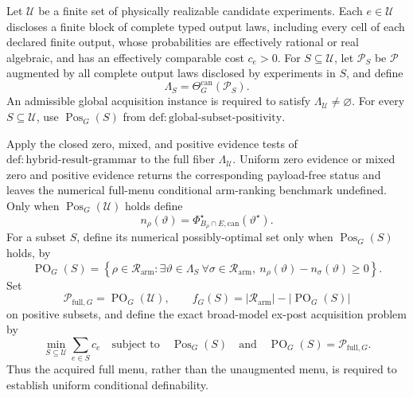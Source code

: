 Let \(\mathcal U\) be a finite set of physically realizable candidate experiments.  Each \(e\in\mathcal U\) discloses a finite block of complete typed output laws, including every cell of each declared finite output, whose probabilities are effectively rational or real algebraic, and has an effectively comparable cost \(c_e>0\).  For \(S\subseteq\mathcal U\), let \(\mathcal P_S\) be \(\mathcal P\) augmented by all complete output laws disclosed by experiments in \(S\), and define
\[
\Lambda_S=\Theta_G^{\mathrm{can}}(\mathcal P_S).
\]
An admissible global acquisition instance is required to satisfy \(\Lambda_{\mathcal U}\ne\varnothing\).  For every \(S\subseteq\mathcal U\), use \(\operatorname{Pos}_G(S)\) from \(\mathrm{def:global\text{-}subset\text{-}positivity}\).

Apply the closed zero, mixed, and positive evidence tests of \(\mathrm{def:hybrid\text{-}result\text{-}grammar}\) to the full fiber \(\Lambda_{\mathcal U}\).  Uniform zero evidence or mixed zero and positive evidence returns the corresponding payload-free status and leaves the numerical full-menu conditional arm-ranking benchmark undefined.  Only when \(\operatorname{Pos}_G(\mathcal U)\) holds define
\[
n_\rho(\vartheta)
=\Phi_{B_\rho\cap E,\mathrm{can}}^\star(\vartheta^\star).
\]
For a subset \(S\), define its numerical possibly-optimal set only when \(\operatorname{Pos}_G(S)\) holds, by
\[
\operatorname{PO}_G(S)
=\left\{\rho\in\mathcal R_{\mathrm{arm}}:
\exists\vartheta\in\Lambda_S\ \forall\sigma\in\mathcal R_{\mathrm{arm}},\ 
n_\rho(\vartheta)-n_\sigma(\vartheta)\geq0\right\}.
\]
Set
\[
\mathcal P_{\mathrm{full},G}=\operatorname{PO}_G(\mathcal U),
\qquad
f_G(S)=|\mathcal R_{\mathrm{arm}}|-|\operatorname{PO}_G(S)|
\]
on positive subsets, and define the exact broad-model ex-post acquisition problem by
\[
\min_{S\subseteq\mathcal U}\sum_{e\in S}c_e
\quad\text{subject to}\quad
\operatorname{Pos}_G(S)
\quad\text{and}\quad
\operatorname{PO}_G(S)=\mathcal P_{\mathrm{full},G}.
\]
Thus the acquired full menu, rather than the unaugmented menu, is required to establish uniform conditional definability.